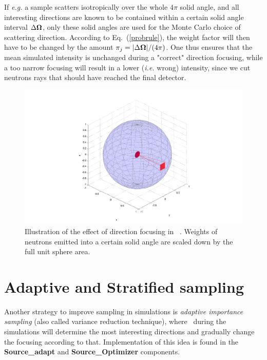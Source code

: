 If {\em e.g.} a sample scatters isotropically
over the whole $4\pi$ solid angle, and all interesting
directions are known to be contained within a certain
solid angle interval $\Delta \mbox{\boldmath $\Omega$}$, only these solid angles
are used for the Monte Carlo choice of scattering direction.
According to Eq.~(\ref{probrule}), the weight factor will then have
to be changed by the amount
$\pi_j = |\Delta \mbox{\boldmath $\Omega$}| / (4 \pi)$.
One thus ensures that the mean simulated intensity is unchanged
during a "correct" direction focusing, while a too narrow focusing will
result in a lower (\textit{i.e.} wrong) intensity, since
we cut neutrons rays that should have reached the final detector.

\begin{figure}[htb!]
\begin{center}
\includegraphics[width=.8\textwidth]{figures/focusing}
\end{center}
\caption{Illustration of the effect of direction focusing in \MCS\
  . Weights of neutrons emitted into a certain solid angle are
  scaled down by the full unit sphere area.}
\label{fig:focusing}
\end{figure}

\section{Adaptive and Stratified sampling}
Another strategy to improve sampling in simulations
is \emph{adaptive importance sampling} (also called variance reduction technique), %
where \MCS\ during the simulations will determine
the most interesting directions and gradually change
the focusing according to that.
Implementation of this idea is
found in the {\bf Source\_adapt} and {\bf Source\_Optimizer} components.


